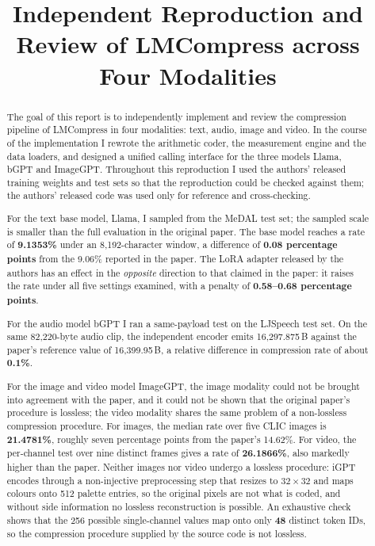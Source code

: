 \documentclass[12pt,a4paper]{article}
\title{Independent Reproduction and Review of LMCompress across Four Modalities}
\author{}
\date{}
\begin{document}
\maketitle

\begin{abstract}
\noindent
The goal of this report is to independently implement and review the compression
pipeline of LMCompress in four modalities: text, audio, image and video. In the course
of the implementation I rewrote the arithmetic coder, the measurement engine and the
data loaders, and designed a unified calling interface for the three models Llama, bGPT
and ImageGPT. Throughout this reproduction I used the authors' released training weights
and test sets so that the reproduction could be checked against them; the authors'
released code was used only for reference and cross-checking.

For the text base model, Llama, I sampled from the MeDAL test set; the sampled scale is
smaller than the full evaluation in the original paper. The base model reaches a rate of
\textbf{9.1353\%} under an 8{,}192-character window, a difference of \textbf{0.08
percentage points} from the 9.06\% reported in the paper. The LoRA adapter released by the
authors has an effect in the \emph{opposite} direction to that claimed in the paper: it
raises the rate under all five settings examined, with a penalty of
\textbf{0.58--0.68 percentage points}.

For the audio model bGPT I ran a same-payload test on the LJSpeech test set. On the same
82{,}220-byte audio clip, the independent encoder emits 16{,}297.875\,B against the
paper's reference value of 16{,}399.95\,B, a relative difference in compression rate of
about \textbf{0.1\%}.

For the image and video model ImageGPT, the image modality could not be brought into
agreement with the paper, and it could not be shown that the original paper's procedure is
lossless; the video modality shares the same problem of a non-lossless compression
procedure. For images, the median rate over five CLIC images is \textbf{21.4781\%},
roughly seven percentage points from the paper's 14.62\%. For video, the per-channel test
over nine distinct frames gives a rate of \textbf{26.1866\%}, also markedly higher than the
paper. Neither images nor video undergo a lossless procedure: iGPT encodes through a
non-injective preprocessing step that resizes to $32\times32$ and maps colours onto 512
palette entries, so the original pixels are not what is coded, and without side information
no lossless reconstruction is possible. An exhaustive check shows that the 256 possible
single-channel values map onto only \textbf{48} distinct token IDs, so the compression
procedure supplied by the source code is not lossless.


\end{abstract}
\end{document}
